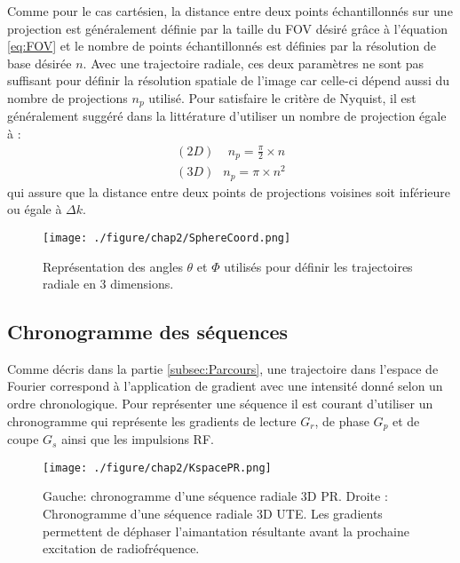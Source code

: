 Comme pour le cas cartésien, la distance entre deux points échantillonnés sur une projection est généralement définie par la taille du FOV désiré grâce à l'équation \ref{eq:FOV} et le nombre de points échantillonnés est définies par la résolution de base désirée $n$. Avec une trajectoire radiale, ces deux paramètres ne sont pas suffisant pour définir la résolution spatiale de l'image car celle-ci dépend aussi du nombre de projections $n_p$ utilisé. Pour satisfaire le critère de Nyquist, il est généralement suggéré dans la littérature \cite{bernstein2004handbook}  d'utiliser un nombre de projection égale à :
\begin{equation}
\label{eq:NyquistRad}
\begin{aligned}
	(2D)\;\;\;\; n_p = \frac{\pi}{2} \times n \\
	(3D)\;\ \ n_p = \pi \times n^2 
\end{aligned}
\end{equation}
qui assure que la distance entre deux points de projections voisines soit inférieure ou égale à $\Delta k$.
\begin{figure}
\centering
\texttt{[image: ./figure/chap2/SphereCoord.png]}
\caption[Coordonnées sphériques]{\label{fig:SphereCoord} Représentation des angles $\theta$ et $\Phi$ utilisés  pour définir les trajectoires radiale en 3 dimensions.}
\end{figure}


\subsection{Chronogramme des séquences}

Comme décris dans la partie \ref{subsec:Parcours}, une trajectoire dans l'espace de Fourier correspond à l'application de gradient avec une intensité donné selon un ordre chronologique. Pour représenter une séquence il est courant d'utiliser un chronogramme qui représente les gradients de lecture $G_r$, de phase $G_p$ et de coupe $G_s$ ainsi que les impulsions RF.

\begin{figure}[h]
\centering
\texttt{[image: ./figure/chap2/KspacePR.png]}
\caption[Coordonnées sphériques]{\label{fig:KspacePR} Gauche: chronogramme d'une séquence radiale 3D PR. Droite : Chronogramme d'une séquence radiale 3D UTE. Les gradients permettent de déphaser l'aimantation résultante avant la prochaine excitation de radiofréquence.} 
\end{figure}

